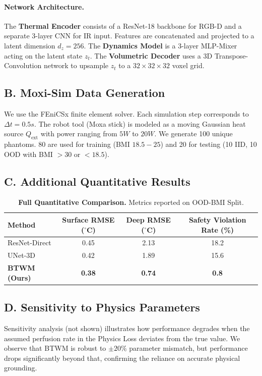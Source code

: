 \documentclass{article}
\begin{document}
\paragraph{Network Architecture.}
The \textbf{Thermal Encoder} consists of a ResNet-18 backbone for RGB-D and a separate 3-layer CNN for IR input. Features are concatenated and projected to a latent dimension $d_z = 256$.
The \textbf{Dynamics Model} is a 3-layer MLP-Mixer acting on the latent state $z_t$.
The \textbf{Volumetric Decoder} uses a 3D Transpose-Convolution network to upsample $z_t$ to a $32 \times 32 \times 32$ voxel grid.

\subsection{B. Moxi-Sim Data Generation}
We use the FEniCSx finite element solver. Each simulation step corresponds to $\Delta t = 0.5s$. The robot tool (Moxa stick) is modeled as a moving Gaussian heat source $Q_{\mathrm{ext}}$ with power ranging from $5W$ to $20W$.
We generate 100 unique phantoms. 80 are used for training (BMI $18.5-25$) and 20 for testing (10 IID, 10 OOD with BMI $>30$ or $<18.5$).

\subsection{C. Additional Quantitative Results}

\begin{table}[h]
  \caption{\textbf{Full Quantitative Comparison.} Metrics reported on OOD-BMI Split.}
  \label{tab:full_results}
  \centering
  \begin{tabular}{lccc}
    \toprule
    Method & Surface RMSE ($^\circ$C) & Deep RMSE ($^\circ$C) & Safety Violation Rate (\%) \\
    \midrule
    ResNet-Direct & 0.45 & 2.13 & 18.2 \\
    UNet-3D & 0.42 & 1.89 & 15.6 \\
    \textbf{BTWM (Ours)} & \textbf{0.38} & \textbf{0.74} & \textbf{0.8} \\
    \bottomrule
  \end{tabular}
\end{table}

\subsection{D. Sensitivity to Physics Parameters}
Sensitivity analysis (not shown) illustrates how performance degrades when the assumed perfusion rate in the Physics Loss deviates from the true value. We observe that BTWM is robust to $\pm 20\%$ parameter mismatch, but performance drops significantly beyond that, confirming the reliance on accurate physical grounding.
\end{document}
